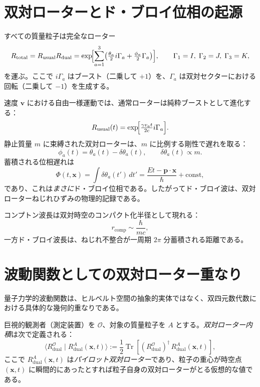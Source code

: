 \documentclass[a4paper]{article}
\begin{document}
\section{双対ローターとド・ブロイ位相の起源}

すべての質量粒子は完全なローター
\[
R_\text{total} = R_\text{usual} R_\text{dual}
  = \exp\!\Bigl[\sum_{a=1}^3 \bigl(\tfrac{\theta_a}{2} i\Gamma_a + \tfrac{\phi_a}{2}\Gamma_a\bigr)\Bigr],
\qquad \Gamma_1=I,\;\Gamma_2=J,\;\Gamma_3=K,
\]
を運ぶ。ここで $i\Gamma_a$ はブースト（二乗して $+1$）を、$\Gamma_a$ は双対セクターにおける回転（二乗して $-1$）を生成する。

速度 $\mathbf{v}$ における自由一様運動では、通常ローターは純粋ブーストとして進化する：
\[
R_\text{usual}(t) = \exp\!\Bigl[\tfrac{\gamma v_a t}{2c} i\Gamma_a\Bigr].
\]
静止質量 $m$ に束縛された双対ローターは、$m$ に比例する剛性で遅れを取る：
\[
\phi_a(t) = \theta_a(t) - \delta\theta_a(t),\qquad
\delta\theta_a(t) \propto m.
\]
蓄積される位相遅れは
\[
\Phi(t,\mathbf{x}) = \int \delta\theta_a(t')\,dt'
  = \frac{E t - \mathbf{p}\cdot\mathbf{x}}{\hbar} + \text{const},
\]
であり、これは\emph{まさに}ド・ブロイ位相である。したがってド・ブロイ波は、双対ローターねじれひずみの物理的記録である。

コンプトン波長は双対時空のコンパクト化半径として現れる：
\[
r_\text{comp} \sim \frac{\hbar}{mc},
\]
一方ド・ブロイ波長は、ねじれ不整合が一周期 $2\pi$ 分蓄積される距離である。

\section{波動関数としての双対ローター重なり}
\label{sec:wavefunction}

量子力学的波動関数は、ヒルベルト空間の抽象的実体ではなく、双四元数代数における具体的な幾何的重なりである。

巨視的観測者（測定装置）を $\mathcal{O}$、対象の質量粒子を $A$ とする。\emph{双対ローター内積}は次で定義される：
\begin{equation}
\langle R_{\text{dual}}^{\mathcal{O}} \mid R_{\text{dual}}^{A}(\mathbf{x},t) \rangle
:= \frac{1}{2} \operatorname{Tr}\!\left[ (R_{\text{dual}}^{\mathcal{O}})^\dagger \, R_{\text{dual}}^{A}(\mathbf{x},t) \right],
\label{eq:innerproduct}
\end{equation}
ここで $R_{\text{dual}}^{A}(\mathbf{x},t)$ は\emph{パイロット双対ローター}であり、粒子の重心が時空点 $(\mathbf{x},t)$ に瞬間的にあったとすれば粒子自身の双対ローターがとる仮想的な値である。
\end{document}
